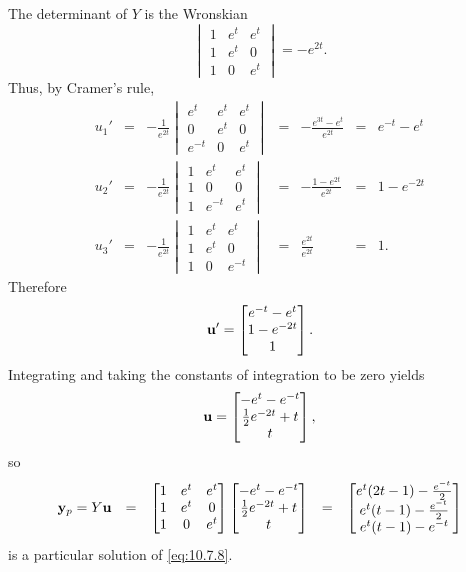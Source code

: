 \documentclass{ximera}
\begin{document}
\begin{example}
\begin{explanation}
The determinant of $Y$  is the Wronskian
$$
\begin{vmatrix}1&e^t&e^t\\1&e^t&0\\1&0&e^t\end{vmatrix}
=-e^{2t}.
$$
Thus, by Cramer's rule,
$$
\begin{array}{cccccll}
u_1'&=&-\frac{1}{e^{2t}}\begin{vmatrix}e^t&e^t&e^t\\0&e^t&0\\e^{-t}&0&e^t
\end{vmatrix}&=&-\frac{e^{3t}-e^t}{e^{2t}}&=&e^{-t}-e^t\\ u_2'&=&-\frac{1}{e^{2t}}\begin{vmatrix}1&e^t&e^t\\1&0&0\\1&e^{-t}&e^t
\end{vmatrix}&=&-\frac{1-e^{2t}}{e^{2t}}&=&1-e^{-2t}\\
u_3'&=&-\frac{1}{e^{2t}}\begin{vmatrix}1&e^t&e^t\\1&e^t&0\\1&0&e^{-t}
\end{vmatrix}&=&\frac{e^{2t}}{e^{2t}}&=&1.
\end{array}
$$
 Therefore
$$
{\bf u}'=\begin{bmatrix}e^{-t}-e^t\\1-e^{-2t}\\1\end{bmatrix}.
$$
Integrating and taking the constants of integration to be zero yields
$$
{\bf
u}=\begin{bmatrix}-e^t-e^{-t}\\\frac{1}{2}e^{-2t}+t
\\t\end{bmatrix},
$$
so
$$
\begin{array}{ccccl}
{\bf y}_p=Y{\bf u}&=&
\begin{bmatrix}1&e^t&e^t\\1&e^t&0\\1&0&e^t\end{bmatrix}
\begin{bmatrix}-e^t-e^{-t}\\\frac{1}{2}e^{-2t}+t\\t\end{bmatrix}
&=&\begin{bmatrix}e^t(2t-1)-\frac{e^{-t}}{2}\\
e^t(t-1)-\frac{e^{-t}}{2}\\
e^t(t-1)-e^{-t}
\end{bmatrix}
\end{array}
$$
is a particular solution of  \eqref{eq:10.7.8}.


\end{explanation}
\end{example}
\end{document}
